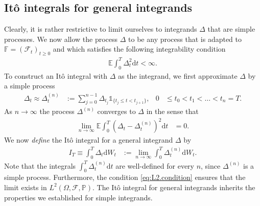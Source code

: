 \documentclass[12pt]{book}
\numberwithin{equation}{chapter}
\theoremstyle{plain}
\numberwithin{theorem}{section}
\theoremstyle{definition}
\numberwithin{exercise}{chapter}
\newcommand{\<}{\langle}
\renewcommand{\>}{\rangle}
\renewcommand{\(}{\left(}
\renewcommand{\)}{\right)}
\renewcommand{\[}{\left[}
\renewcommand{\]}{\right]}
\newcommand\Eb{\mathds{E}}
\newcommand\Fb{\mathds{F}}
\newcommand\Ib{\mathds{1}} 	%
\newcommand\Pb{\mathds{P}}
\newcommand\Fc{\mathscr{F}}
\newcommand\Om{\Omega}
\newcommand\Del{\Delta}
\newcommand\dd{\mathrm{d}}
\begin{document}
\subsection*{It\^o integrals for general integrands}
Clearly, it is rather restrictive to limit ourselves to integrands $\Del$ that are simple processes.  We now allow the process $\Del$ to be any process that is adapted to $\Fb=(\Fc_t)_{t \geq 0}$ and which satisfies the following integrability condition
\begin{align}
\Eb \int_0^T \Del_t^2 \dd t 
	< \infty . \label{eq:L2.condition}
\end{align}
To construct an It\^o integral with $\Del$ as the integrand, we first approximate $\Del$ by a simple process
\begin{align}
\Del_t \approx \Del_t^{(n)}
	&:=	\sum_{j=0}^{n-1} \Del_{t_j} \Ib_{\{ t_j \leq t < t_{j+1} \}} , &
0
	&\leq t_0 < t_1 < \ldots < t_n = T .
\end{align}
As $n \to \infty$ the process $\Del^{(n)}$ converges to $\Del$ in the sense that
\begin{align}
\lim_{n \to \infty} \Eb \int_0^T \( \Del_t - \Del_t^{(n)} \)^2 \dd t
	&=	0 . \label{eq:L2.condition}
\end{align}
We now \emph{define} the It\^o integral for a general integrand $\Del$ by
\begin{align}
I_T
	\equiv \int_0^T \Del_t \dd W_t
	&:=			\lim_{n \to \infty} \int_0^T \Del_t^{(n)} \dd W_t . \label{eq:Ito.def}
\end{align}
Note that the integrals $\int_0^T \Del_t^{(n)} \dd t$ are well-defined for every $n$, since $\Del^{(n)}$ is a simple process.  
Furthermore, the condition \eqref{eq:L2.condition} ensures that the limit exists in $L^2(\Om,\Fc,\Pb)$.
The It\^o integral for general integrands inherits the properties we established for simple integrands.
\end{document}
